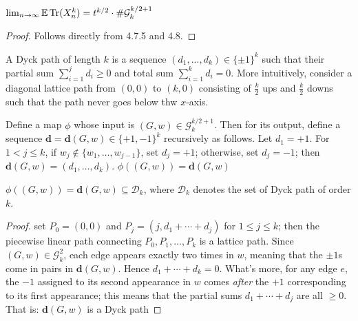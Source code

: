 \begin{proposition}%
  \label{prop:trace_ev_limit_equals_t_special_g}
  \notready
  $\lim_{n\to\infty} \mathbb{E}\operatorname{Tr}(X_n^k) = t^{k/2}\cdot\#\mathcal{G}_k^{k/2+1}$
\end{proposition}

\begin{proof}
  \notready
  Follows directly from 4.7.5 and 4.8.
\end{proof}





\begin{definition}
    \notready
    \label{def:Dyck_paths}
  A Dyck path of length $k$ is a sequence $(d_1,...,d_k) \in \{\pm 1\}^k$ such that their partial sum $\sum_{i=1}^j d_i \geq 0$
  and total sum $\sum_{i = 1}^{k}d_i = 0$. More intuitively, consider a diagonal lattice path from $(0,0)$ to $(k, 0)$ consisting of
  $\frac{k}{2}$ ups and $\frac{k}{2}$ downs such that the path never goes below thw $x$-axis.
\end{definition}


\begin{definition}
    \notready
    \label{def:graph_to_Dyck_map}
   Define a map $\phi$ whose input is $(G, w) \in \mathcal{G}^{k/2 + 1}_k$. Then for its output,
   define a sequence $\mathbf{d}=\mathbf{d}(G,w)\in\{+1,-1\}^k$ recursively as follows.
   Let $d_1=+1$.  For $1<j\le k$, if $w_j\notin\{w_1,\ldots,w_{j-1}\}$, set $d_j=+1$; otherwise, set $d_j=-1$; then
   $\mathbf{d}(G,w) = (d_1,\ldots,d_k)$. $\phi((G,w)) = \mathbf{d}(G,w)$
\end{definition}


\begin{lemma}
    \notready
    \label{lem:graph_Dyck_correspondence}
  $\phi((G,w)) = \mathbf{d}(G,w) \subseteq \mathcal{D}_k$, where $\mathcal{D}_k$ denotes the set of Dyck path of order $k$.
  \begin{proof}
    \notready
    set $P_0 = (0,0)$ and $P_j = (j,d_1+\cdots+d_j)$ for $1\le j\le k$; then the piecewise linear path
    connecting $P_0,P_1,\ldots,P_k$ is a lattice path.  Since $(G,w)\in\mathcal{G}_k^2$, each edge appears exactly two times in $w$,
    meaning that the $\pm1$s come in pairs in $\mathbf{d}(G,w)$.  Hence $d_1+\cdots+d_k=0$.  What's more, for any edge $e$,
    the $-1$ assigned to its second appearance in $w$ comes {\em after} the $+1$ corresponding to its first appearance;
    this means that the partial sums $d_1+\cdots+d_j$ are all $\ge 0$.  That is: $\mathbf{d}(G,w)$ is a Dyck path
  \end{proof}
\end{lemma}


